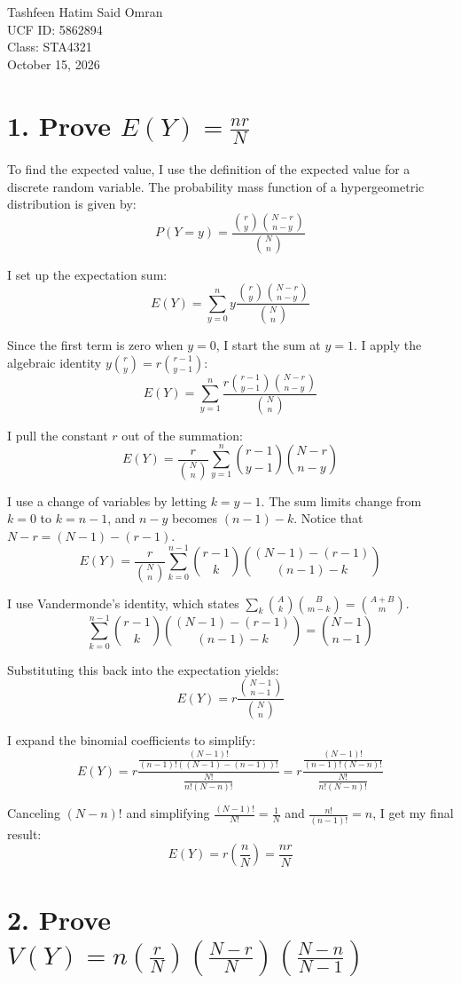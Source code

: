 \documentclass{article}
\begin{document}
\noindent
Tashfeen Hatim Said Omran\\
UCF ID: 5862894\\
Class: STA4321\\
October 15, 2026

\vspace{1em}

\section*{1. Prove $E(Y) = \frac{nr}{N}$}

To find the expected value, I use the definition of the expected value for a discrete random variable. The probability mass function of a hypergeometric distribution is given by:
\[ P(Y = y) = \frac{\binom{r}{y}\binom{N-r}{n-y}}{\binom{N}{n}} \]

I set up the expectation sum:
\[ E(Y) = \sum_{y=0}^{n} y \frac{\binom{r}{y}\binom{N-r}{n-y}}{\binom{N}{n}} \]

Since the first term is zero when $y=0$, I start the sum at $y=1$. I apply the algebraic identity $y\binom{r}{y} = r\binom{r-1}{y-1}$:
\[ E(Y) = \sum_{y=1}^{n} \frac{r\binom{r-1}{y-1}\binom{N-r}{n-y}}{\binom{N}{n}} \]

I pull the constant $r$ out of the summation:
\[ E(Y) = \frac{r}{\binom{N}{n}} \sum_{y=1}^{n} \binom{r-1}{y-1}\binom{N-r}{n-y} \]

I use a change of variables by letting $k = y - 1$. The sum limits change from $k=0$ to $k=n-1$, and $n-y$ becomes $(n-1)-k$. Notice that $N-r = (N-1)-(r-1)$.
\[ E(Y) = \frac{r}{\binom{N}{n}} \sum_{k=0}^{n-1} \binom{r-1}{k}\binom{(N-1)-(r-1)}{(n-1)-k} \]

I use Vandermonde's identity, which states $\sum_{k} \binom{A}{k}\binom{B}{m-k} = \binom{A+B}{m}$.
\[ \sum_{k=0}^{n-1} \binom{r-1}{k}\binom{(N-1)-(r-1)}{(n-1)-k} = \binom{N-1}{n-1} \]

Substituting this back into the expectation yields:
\[ E(Y) = r \frac{\binom{N-1}{n-1}}{\binom{N}{n}} \]

I expand the binomial coefficients to simplify:
\[ E(Y) = r \frac{\frac{(N-1)!}{(n-1)!((N-1)-(n-1))!}}{\frac{N!}{n!(N-n)!}} = r \frac{\frac{(N-1)!}{(n-1)!(N-n)!}}{\frac{N!}{n!(N-n)!}} \]

Canceling $(N-n)!$ and simplifying $\frac{(N-1)!}{N!} = \frac{1}{N}$ and $\frac{n!}{(n-1)!} = n$, I get my final result:
\[ E(Y) = r \left( \frac{n}{N} \right) = \frac{nr}{N} \]


\section*{2. Prove $V(Y) = n\left(\frac{r}{N}\right)\left(\frac{N-r}{N}\right)\left(\frac{N-n}{N-1}\right)$}
\end{document}
